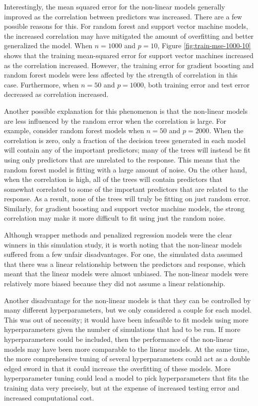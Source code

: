 \documentclass{article}
\begin{document}
Interestingly, the mean squared error for the non-linear models generally improved as the correlation between predictors was increased. There are a few possible reasons for this. For random forest and support vector machine models, the increased correlation may have mitigated the amount of overfitting and better generalized the model. When $n = 1000$ and $p = 10$, Figure \ref{fig:train-mse-1000-10} shows that the training mean-squared error for support vector machines increased as the correlation increased. However, the training error for gradient boosting and random forest models were less affected by the strength of correlation in this case. Furthermore, when $n = 50$ and $p = 1000$, both training error and test error decreased as correlation increased.

Another possible explanation for this phenomenon is that the non-linear models are less influenced by the random error when the correlation is large. For example, consider random forest models when $n = 50$ and $p = 2000$. When the correlation is zero, only a fraction of the decision trees generated in each model will contain any of the important predictors; many of the trees will instead be fit using only predictors that are unrelated to the response. This means that the random forest model is fitting with a large amount of noise. On the other hand, when the correlation is high, all of the trees will contain predictors that somewhat correlated to some of the important predictors that are related to the response. As a result, none of the trees will truly be fitting on just random error. Similarly, for gradient boosting and support vector machine models, the strong correlation may make it more difficult to fit using just the random noise.

Although wrapper methods and penalized regression models were the clear winners in this simulation study, it is worth noting that the non-linear models suffered from a few unfair disadvantages. For one, the simulated data assumed that there was a linear relationship between the predictors and response, which meant that the linear models were almost unbiased. The non-linear models were relatively more biased because they did not assume a linear relationship. 

Another disadvantage for the non-linear models is that they can be controlled by many different hyperparameters, but we only considered a couple for each model. This was out of necessity; it would have been infeasible to fit models using more hyperparameters given the number of simulations that had to be run. If more hyperparameters could be included, then the performance of the non-linear models may have been more comparable to the linear models. At the same time, the more comprehensive tuning of several hyperparameters could act as a double edged sword in that it could increase the overfitting of these models. More hyperparameter tuning could lead a model to pick hyperparameters that fits the training data very precisely, but at the expense of increased testing error and increased computational cost.
\end{document}
